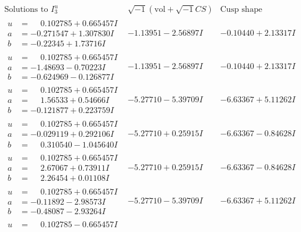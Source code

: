 \documentclass[1p]{elsarticle_modified}
\theoremstyle{definition}
\newcommand{\I}{\sqrt{-1}}
\begin{document}
$$\begin{array}{c|c|c}  
\text{Solutions to }I^u_{3}& \I (\text{vol} + \sqrt{-1}CS) & \text{Cusp shape}\\
 \hline 
\begin{aligned}
u &= \phantom{-}0.102785 + 0.665457 I \\
a &= -0.271547 + 1.307830 I \\
b &= -0.22345 + 1.73716 I\end{aligned}
 & -1.13951 - 2.56897 I & -0.10440 + 2.13317 I \\ \hline\begin{aligned}
u &= \phantom{-}0.102785 + 0.665457 I \\
a &= -1.48693 - 0.70223 I \\
b &= -0.624969 - 0.126877 I\end{aligned}
 & -1.13951 - 2.56897 I & -0.10440 + 2.13317 I \\ \hline\begin{aligned}
u &= \phantom{-}0.102785 + 0.665457 I \\
a &= \phantom{-}1.56533 + 0.54666 I \\
b &= -0.121877 + 0.223759 I\end{aligned}
 & -5.27710 - 5.39709 I & -6.63367 + 5.11262 I \\ \hline\begin{aligned}
u &= \phantom{-}0.102785 + 0.665457 I \\
a &= -0.029119 + 0.292106 I \\
b &= \phantom{-}0.310540 - 1.045640 I\end{aligned}
 & -5.27710 + 0.25915 I & -6.63367 - 0.84628 I \\ \hline\begin{aligned}
u &= \phantom{-}0.102785 + 0.665457 I \\
a &= \phantom{-}2.67067 + 0.73911 I \\
b &= \phantom{-}2.26454 + 0.01108 I\end{aligned}
 & -5.27710 + 0.25915 I & -6.63367 - 0.84628 I \\ \hline\begin{aligned}
u &= \phantom{-}0.102785 + 0.665457 I \\
a &= -0.11892 - 2.98573 I \\
b &= -0.48087 - 2.93264 I\end{aligned}
 & -5.27710 - 5.39709 I & -6.63367 + 5.11262 I \\ \hline\begin{aligned}
u &= \phantom{-}0.102785 - 0.665457 I \\

\end{aligned}
\end{array}$$
\end{document}
